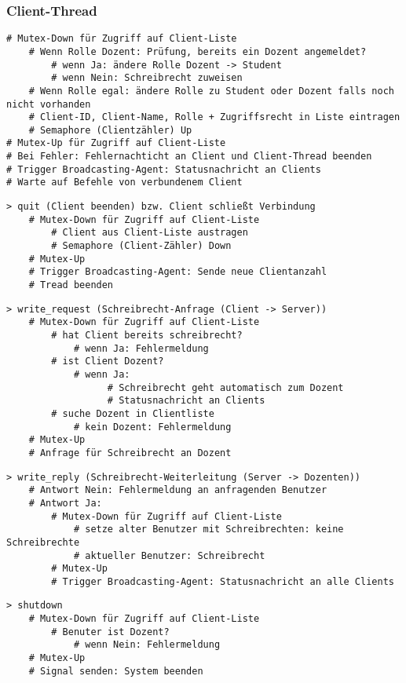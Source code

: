 \subsubsection{Client-Thread}
\begin{lstlisting}
# Mutex-Down für Zugriff auf Client-Liste 
    # Wenn Rolle Dozent: Prüfung, bereits ein Dozent angemeldet?
        # wenn Ja: ändere Rolle Dozent -> Student
        # wenn Nein: Schreibrecht zuweisen
    # Wenn Rolle egal: ändere Rolle zu Student oder Dozent falls noch nicht vorhanden
    # Client-ID, Client-Name, Rolle + Zugriffsrecht in Liste eintragen
    # Semaphore (Clientzähler) Up
# Mutex-Up für Zugriff auf Client-Liste
# Bei Fehler: Fehlernachticht an Client und Client-Thread beenden
# Trigger Broadcasting-Agent: Statusnachricht an Clients
# Warte auf Befehle von verbundenem Client
\end{lstlisting}
\begin{lstlisting}
> quit (Client beenden) bzw. Client schließt Verbindung
    # Mutex-Down für Zugriff auf Client-Liste
        # Client aus Client-Liste austragen
        # Semaphore (Client-Zähler) Down
    # Mutex-Up
    # Trigger Broadcasting-Agent: Sende neue Clientanzahl
    # Tread beenden
\end{lstlisting}
\begin{lstlisting}
> write_request (Schreibrecht-Anfrage (Client -> Server))
    # Mutex-Down für Zugriff auf Client-Liste
        # hat Client bereits schreibrecht?
            # wenn Ja: Fehlermeldung
		# ist Client Dozent?
			# wenn Ja: 
				  # Schreibrecht geht automatisch zum Dozent
				  # Statusnachricht an Clients
        # suche Dozent in Clientliste
            # kein Dozent: Fehlermeldung
    # Mutex-Up
    # Anfrage für Schreibrecht an Dozent
\end{lstlisting}
\begin{lstlisting}
> write_reply (Schreibrecht-Weiterleitung (Server -> Dozenten))
    # Antwort Nein: Fehlermeldung an anfragenden Benutzer
	# Antwort Ja:
		# Mutex-Down für Zugriff auf Client-Liste
			# setze alter Benutzer mit Schreibrechten: keine Schreibrechte
			# aktueller Benutzer: Schreibrecht
		# Mutex-Up
    	# Trigger Broadcasting-Agent: Statusnachricht an alle Clients
\end{lstlisting}
\begin{lstlisting}
> shutdown
    # Mutex-Down für Zugriff auf Client-Liste
        # Benuter ist Dozent?
            # wenn Nein: Fehlermeldung
    # Mutex-Up
    # Signal senden: System beenden
\end{lstlisting}
